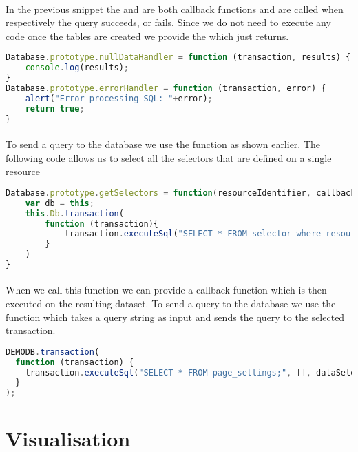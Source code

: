 	\paragraph{}
	In the previous snippet the  and  are both callback functions and are called when respectively the query succeeds, or fails. Since we do not need to execute any code once the tables are created we provide the  which just returns.
	\begin{lstlisting}[language=JavaScript]
Database.prototype.nullDataHandler = function (transaction, results) {
	console.log(results);
}
Database.prototype.errorHandler = function (transaction, error) {
	alert("Error processing SQL: "+error);
	return true;
}
	\end{lstlisting}

	\paragraph{}
	To send a query to the database we use the  function as shown earlier. The following code allows us to select all the selectors that are defined on a single resource
	\begin{lstlisting}[language=JavaScript]
Database.prototype.getSelectors = function(resourceIdentifier, callback){
	var db = this;
	this.Db.transaction(
		function (transaction){
			transaction.executeSql("SELECT * FROM selector where resourceId = ? ;", [resourceIdentifier], db.resultHandler(callback));
		}
	)
}
	\end{lstlisting}
	\paragraph{}
	When we call this function we can provide a callback function which is then executed on the resulting dataset. 
	To send a query to the database we use the  function which takes a query string as input and sends the query to the selected transaction.
	\begin{lstlisting}[language=JavaScript]	
DEMODB.transaction(
  function (transaction) {
    transaction.executeSql("SELECT * FROM page_settings;", [], dataSelectHandler, errorHandler);
  }
);
	\end{lstlisting}
	
	\section{Visualisation} \label{sec:Visualisation}
